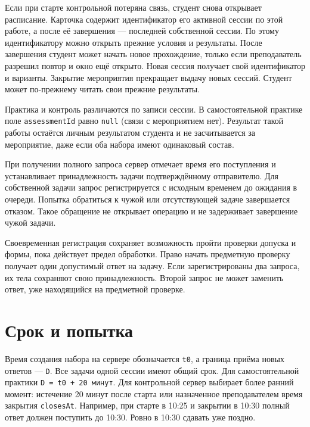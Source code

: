 \documentclass[12pt,a4paper]{article}
\begin{document}
Если при старте контрольной потеряна связь, студент снова открывает расписание. Карточка содержит идентификатор его активной сессии по этой работе, а после её завершения --- последней собственной сессии. По этому идентификатору можно открыть прежние условия и результаты. После завершения студент может начать новое прохождение, только если преподаватель разрешил повтор и окно ещё открыто. Новая сессия получает свой идентификатор и варианты. Закрытие мероприятия прекращает выдачу новых сессий. Студент может по-прежнему читать свои прежние результаты.

Практика и контроль различаются по записи сессии. В самостоятельной практике поле \texttt{assessmentId} равно \texttt{null} (связи с мероприятием нет). Результат такой работы остаётся личным результатом студента и не засчитывается за мероприятие, даже если оба набора имеют одинаковый состав.

При получении полного запроса сервер отмечает время его поступления и устанавливает принадлежность задачи подтверждённому отправителю. Для собственной задачи запрос регистрируется с исходным временем до ожидания в очереди. Попытка обратиться к чужой или отсутствующей задаче завершается отказом. Такое обращение не открывает операцию и не задерживает завершение чужой задачи.

Своевременная регистрация сохраняет возможность пройти проверки допуска и формы, пока действует предел обработки. Право начать предметную проверку получает один допустимый ответ на задачу. Если зарегистрированы два запроса, их тела сохраняют свою принадлежность. Второй запрос не может заменить ответ, уже находящийся на предметной проверке.

\section{Срок и попытка}\label{ux441ux440ux43eux43a-ux438-ux43fux43eux43fux44bux442ux43aux430}

\hypertarget{срок-и-попытка}{}

Время создания набора на сервере обозначается \texttt{t0}, а граница приёма новых ответов --- \texttt{D}. Все задачи одной сессии имеют общий срок. Для самостоятельной практики \texttt{D\ =\ t0\ +\ 20\ минут}. Для контрольной сервер выбирает более ранний момент: истечение 20 минут после старта или назначенное преподавателем время закрытия \texttt{closesAt}. Например, при старте в 10:25 и закрытии в 10:30 полный ответ должен поступить до 10:30. Ровно в 10:30 сдавать уже поздно.
\end{document}
